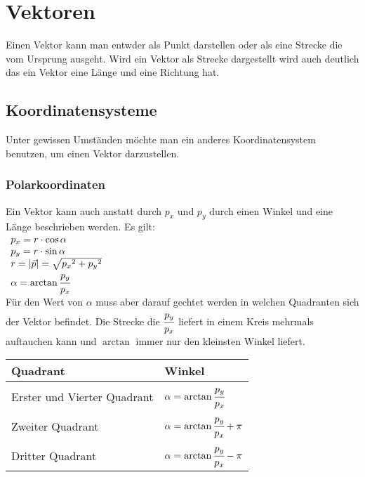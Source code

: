 \documentclass[a4paper,10pt]{scrartcl}
\begin{document}
    \section{Vektoren}
        Einen Vektor kann man entwder als Punkt darstellen oder als eine Strecke die vom Ursprung ausgeht. Wird ein Vektor als Strecke dargestellt wird auch deutlich das ein Vektor eine Länge und eine 
        Richtung hat. 
        \subsection{Koordinatensysteme}
            Unter gewissen Umständen möchte man ein anderes Koordinatensystem benutzen, um einen Vektor darzustellen.
            \subsubsection{Polarkoordinaten}
                Ein Vektor kann auch anstatt durch $p_x$ und $p_y$ durch einen Winkel und eine Länge beschrieben werden.  Es gilt:\\
                $\begin{array}{l}
                    p_x = r \cdot \cos \alpha \\
                    p_y = r \cdot \sin \alpha \\
                    r = |\vec p| = \sqrt{{p_x}^2 + {p_y}^2} \\
                    \alpha = \arctan \cfrac{p_y}{p_x}
                \end{array}$\\
                Für den Wert von $\alpha$ muss aber darauf gechtet werden in welchen Quadranten sich der Vektor befindet. Die Strecke die $\cfrac{p_y}{p_x}$ liefert in einem Kreis 
                mehrmals auftauchen kann und $\arctan$ immer nur den kleinsten Winkel liefert. \\
                \begin{tabular}[h]{|l|l|}
                    \hline
                    Quadrant & Winkel \\
                    \hline
                    Erster und Vierter Quadrant & $\alpha = \arctan \cfrac{p_y}{p_x}$ \\
                    Zweiter Quadrant & $\alpha = \arctan \cfrac{p_y}{p_x} + \pi$ \\
                    Dritter Quadrant & $\alpha = \arctan \cfrac{p_y}{p_x} - \pi$ \\
                    \hline
                \end{tabular}  
\end{document}
